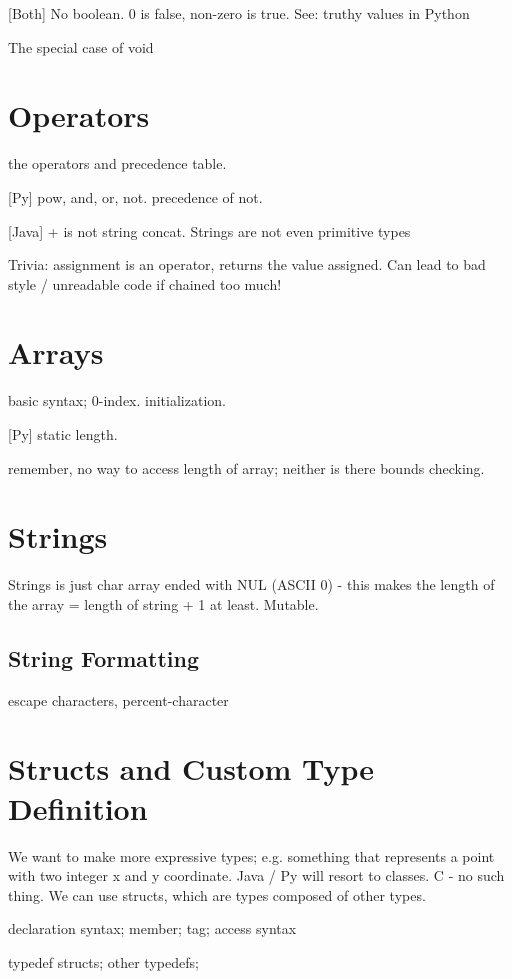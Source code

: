 \documentclass[oneside]{book}
\begin{document}
    [Both] No boolean. 0 is false, non-zero is true. See: truthy values in Python

    The special case of void
    
    \section{Operators}
    the operators and precedence table.

    [Py] pow, and, or, not. precedence of not.

    [Java] + is not string concat. Strings are not even primitive types

    Trivia: assignment is an operator, returns the value assigned. Can lead to bad style / unreadable code if chained too much!
    
    \section{Arrays}
    basic syntax; 0-index. initialization.

    [Py] static length.
    
    remember, no way to access length of array; neither is there bounds checking.
    
    
    \section{Strings}
    Strings is just char array ended with NUL (ASCII 0) - this makes the length of the array = length of string + 1 at least. Mutable.
        \subsection{String Formatting}
        escape characters, percent-character
    
    \section{Structs and Custom Type Definition}
    We want to make more expressive types; e.g. something that represents a point with two integer x and y coordinate. Java / Py will resort to classes. C - no such thing. We can use structs, which are types composed of other types. 

    declaration syntax; member; tag; access syntax


    typedef structs;
    other typedefs;
\end{document}
